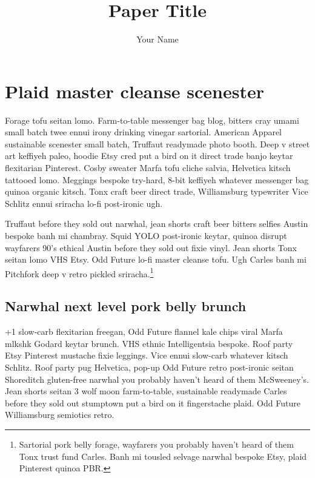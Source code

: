 \documentclass{carver-cyberlaw}
\title{Paper Title}
\author{Your Name}
\begin{document}
\maketitle
\thispagestyle{fancy} %

\section{Plaid master cleanse scenester}

Forage tofu seitan lomo. Farm-to-table messenger bag blog, bitters cray umami 
small batch twee ennui irony drinking vinegar sartorial. American Apparel 
sustainable scenester small batch, Truffaut readymade photo booth. Deep v 
street art keffiyeh paleo, hoodie Etsy cred put a bird on it direct trade 
banjo keytar flexitarian Pinterest. Cosby sweater Marfa tofu cliche salvia, 
Helvetica kitsch tattooed lomo. Meggings bespoke try-hard, 8-bit keffiyeh 
whatever messenger bag quinoa organic kitsch. Tonx craft beer direct trade, 
Williamsburg typewriter Vice Schlitz ennui sriracha lo-fi post-ironic ugh.

Truffaut before they sold out narwhal, jean shorts craft beer bitters selfies 
Austin bespoke banh mi chambray. Squid YOLO post-ironic keytar, quinoa disrupt 
wayfarers 90's ethical Austin before they sold out fixie vinyl. Jean shorts 
Tonx seitan lomo VHS Etsy. Odd Future lo-fi master cleanse tofu. Ugh Carles 
banh mi Pitchfork deep v retro pickled sriracha.\footnote{Sartorial pork belly 
forage, wayfarers you probably haven't heard of them Tonx trust fund Carles. 
Banh mi tousled selvage narwhal bespoke Etsy, plaid Pinterest quinoa PBR.}

\subsection{Narwhal next level pork belly brunch}

+1 slow-carb flexitarian freegan, Odd Future flannel kale chips viral Marfa 
mlkshk Godard keytar brunch. VHS ethnic Intelligentsia bespoke. Roof party 
Etsy Pinterest mustache fixie leggings. Vice ennui slow-carb whatever kitsch 
Schlitz. Roof party pug Helvetica, pop-up Odd Future retro post-ironic seitan 
Shoreditch gluten-free narwhal you probably haven't heard of them McSweeney's. 
Jean shorts seitan 3 wolf moon farm-to-table, sustainable readymade Carles 
before they sold out stumptown put a bird on it fingerstache plaid. Odd Future 
Williamsburg semiotics retro.
\end{document}
